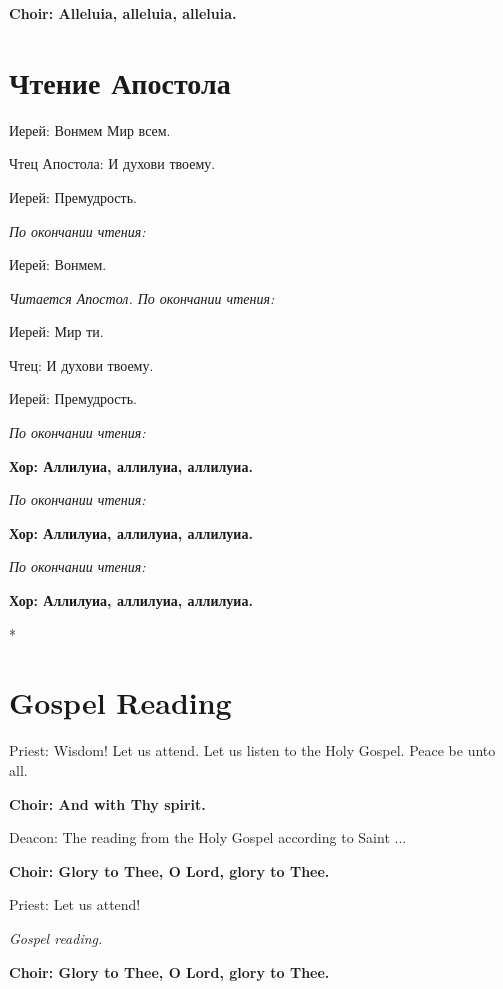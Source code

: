 \documentclass[12pt,a4paper,titlepage]{report}
\begin{document}
\begin{paracol}[1]{2}
	\textbf{Choir: Alleluia, alleluia, alleluia.}
	
	\switchcolumn[1]
	
	\section*{Чтение Апостола}
	
	Иерей: Вонмем Мир всем.
	
	Чтец Апостола: И духови твоему.
	
	Иерей: Премудрость.
	
	\indent \textit{По окончании чтения:}
	
	Иерей: Вонмем.
	
	\indent \textit{Читается Апостол. По окончании чтения:}
	
	Иерей: Мир ти.
	
	Чтец:  И духови твоему.
	
	Иерей: Премудрость.
	
	\textit{По окончании чтения:}
	
	\textbf{Хор: Аллилуиа, аллилуиа, аллилуиа.}
	
	\textit{По окончании чтения:}
	
	\textbf{Хор: Аллилуиа, аллилуиа, аллилуиа.}
	
	\textit{По окончании чтения:}
	
	\textbf{Хор: Аллилуиа, аллилуиа, аллилуиа.}
	
	\switchcolumn[0]*
	
	\section*{Gospel Reading}
	
	Priest: Wisdom! Let us attend. Let us listen to the Holy Gospel. Peace be unto all.
	
	\textbf{Choir: And with Thy spirit.}
	
	Deacon: The reading from the Holy Gospel according to Saint ...
	
	\textbf{Choir: Glory to Thee, O Lord, glory to Thee.}
	
	Priest: Let us attend!
	
	\indent \textit{Gospel reading.}
	
	\textbf{Choir: Glory to Thee, O Lord, glory to Thee.}
	

\end{paracol}
\end{document}
